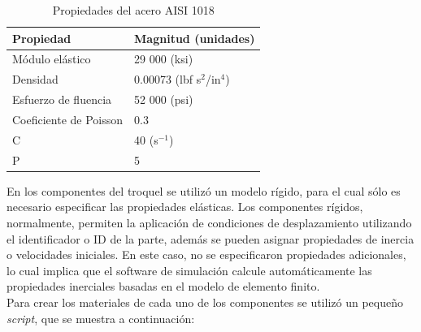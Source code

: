 \begin{table}[h]
\centering
\caption{Propiedades del acero AISI 1018}
\label{tab:steel_properties}
\begin{tabular}{p{4cm} p{4cm}} \hline
Propiedad & Magnitud (unidades) \\
\hline
Módulo elástico & 29 000 (ksi) \\
Densidad & 0.00073 (lbf s$^2$/in$^4$) \\
Esfuerzo de fluencia & 52 000 (psi) \\
Coeficiente de Poisson & 0.3 \\
C & 40 (s$^{-1}$) \\
P & 5 \\
\hline
\end{tabular}
\label{tab:material_properties}
\end{table}

En los componentes del troquel se utilizó un modelo rígido, para el cual sólo es necesario 
especificar las propiedades elásticas. Los componentes rígidos, normalmente, permiten la 
aplicación de condiciones de desplazamiento utilizando el identificador o ID de la parte, además 
se pueden asignar propiedades de inercia o velocidades iniciales. En este caso, no se 
especificaron propiedades adicionales, lo cual implica que el software de simulación calcule automáticamente 
las propiedades inerciales basadas en el modelo de elemento finito. \\

Para crear los materiales de cada uno de los componentes se utilizó un pequeño \textit{script}, 
que se muestra a continuación:

